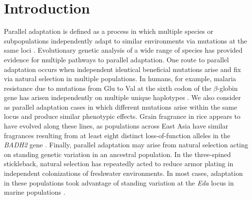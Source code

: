 \section*{Introduction}
\noindent Parallel adaptation is defined as a process in which multiple species or subpopulations independently adapt to similar environments via mutations at the same loci \cite[]{Wood_2005_15881688,Arendt_2008_18022278,Elmer_2011_21459472}.
Evolutionary genetic analysis of a wide range of species has provided evidence for multiple pathways to parallel adaptation. One route to parallel adaptation occurs when independent identical beneficial mutations arise and fix via natural selection in multiple populations. In humans, for example, malaria resistance due to mutations from Glu to Val at the sixth codon of the $\beta$-globin gene has arisen independently on multiple unique haplotypes  \cite[]{Currat_2002_11741197,Kwiatkowski_2005_16001361}.  We also consider as parallel adaptation cases in which different mutations arise within the same locus and produce similar phenotypic effects.  Grain fragrance in rice appears to have evolved along these lines, as populations across East Asia have similar fragrances resulting from at least eight distinct loss-of-function alleles in the  \emph{BADH2} gene \cite[]{Kovach_2009_19706531}.  Finally, parallel adaptation may arise from natural selection acting on standing genetic variation in an ancestral population.  In the three-spined stickleback, natural selection has repeatedly acted to reduce armor plating in independent colonizations of freshwater environments.  In most cases, adaptation in these populations took advantage of standing variation at the \emph{Eda} locus in marine populations \cite[]{Colosimo_2005_15790847}.  
%
%

%
%
%
%

